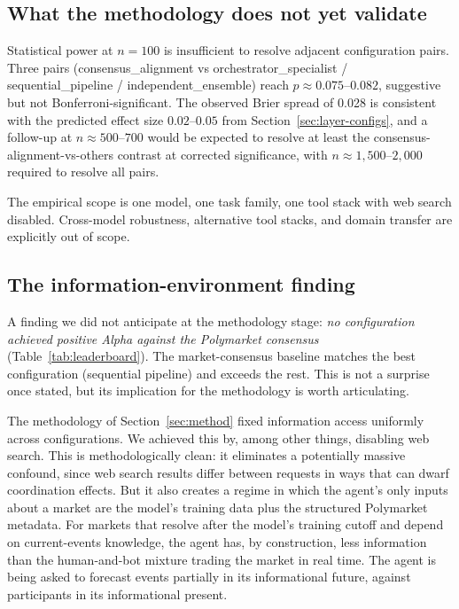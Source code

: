 \documentclass[11pt]{article}
\begin{document}
\subsection{What the methodology does not yet validate}
\label{sec:discussion-not-yet}

Statistical power at $n=100$ is insufficient to resolve adjacent configuration pairs. Three pairs (consensus\_alignment vs orchestrator\_specialist / sequential\_pipeline / independent\_ensemble) reach $p \approx 0.075$--$0.082$, suggestive but not Bonferroni-significant. The observed Brier spread of 0.028 is consistent with the predicted effect size $0.02$--$0.05$ from Section~\ref{sec:layer-configs}, and a follow-up at $n \approx 500$--$700$ would be expected to resolve at least the consensus-alignment-vs-others contrast at corrected significance, with $n \approx 1{,}500$--$2{,}000$ required to resolve all pairs.

The empirical scope is one model, one task family, one tool stack with web search disabled. Cross-model robustness, alternative tool stacks, and domain transfer are explicitly out of scope.

\subsection{The information-environment finding}
\label{sec:discussion-info-env}

A finding we did not anticipate at the methodology stage: \emph{no configuration achieved positive Alpha against the Polymarket consensus} (Table~\ref{tab:leaderboard}). The market-consensus baseline matches the best configuration (sequential pipeline) and exceeds the rest. This is not a surprise once stated, but its implication for the methodology is worth articulating.

The methodology of Section~\ref{sec:method} fixed information access uniformly across configurations. We achieved this by, among other things, disabling web search. This is methodologically clean: it eliminates a potentially massive confound, since web search results differ between requests in ways that can dwarf coordination effects. But it also creates a regime in which the agent's only inputs about a market are the model's training data plus the structured Polymarket metadata. For markets that resolve after the model's training cutoff and depend on current-events knowledge, the agent has, by construction, less information than the human-and-bot mixture trading the market in real time. The agent is being asked to forecast events partially in its informational future, against participants in its informational present.
\end{document}
